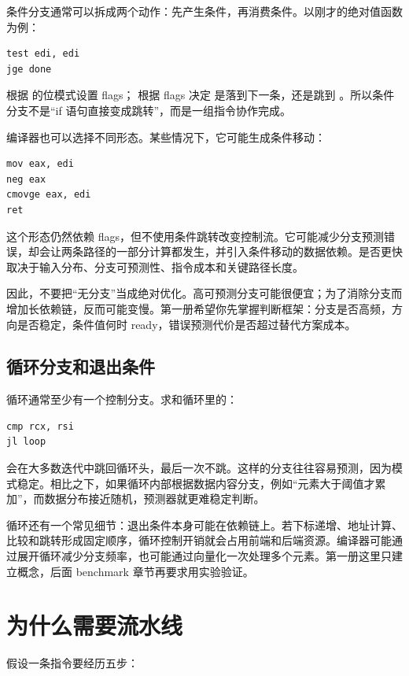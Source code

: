 条件分支通常可以拆成两个动作：先产生条件，再消费条件。以刚才的绝对值函数为例：

\begin{lstlisting}
test edi, edi
jge done
\end{lstlisting}

 根据  的位模式设置 flags； 根据 flags 决定  是落到下一条，还是跳到 。所以条件分支不是“if 语句直接变成跳转”，而是一组指令协作完成。

编译器也可以选择不同形态。某些情况下，它可能生成条件移动：

\begin{lstlisting}
mov eax, edi
neg eax
cmovge eax, edi
ret
\end{lstlisting}

这个形态仍然依赖 flags，但不使用条件跳转改变控制流。它可能减少分支预测错误，却会让两条路径的一部分计算都发生，并引入条件移动的数据依赖。是否更快取决于输入分布、分支可预测性、指令成本和关键路径长度。

因此，不要把“无分支”当成绝对优化。高可预测分支可能很便宜；为了消除分支而增加长依赖链，反而可能变慢。第一册希望你先掌握判断框架：分支是否高频，方向是否稳定，条件值何时 ready，错误预测代价是否超过替代方案成本。

\subsection{循环分支和退出条件}

循环通常至少有一个控制分支。求和循环里的：

\begin{lstlisting}
cmp rcx, rsi
jl loop
\end{lstlisting}

会在大多数迭代中跳回循环头，最后一次不跳。这样的分支往往容易预测，因为模式稳定。相比之下，如果循环内部根据数据内容分支，例如“元素大于阈值才累加”，而数据分布接近随机，预测器就更难稳定判断。

循环还有一个常见细节：退出条件本身可能在依赖链上。若下标递增、地址计算、比较和跳转形成固定顺序，循环控制开销就会占用前端和后端资源。编译器可能通过展开循环减少分支频率，也可能通过向量化一次处理多个元素。第一册这里只建立概念，后面 benchmark 章节再要求用实验验证。

\section{为什么需要流水线}

假设一条指令要经历五步：


